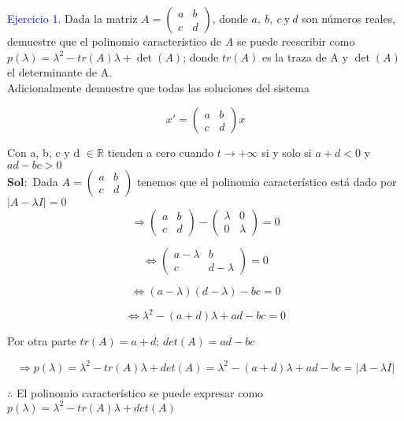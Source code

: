 \textcolor{blue}{Ejercicio 1.} Dada la matriz $ A= \begin{pmatrix}
a & b\\
c & d
\end{pmatrix}$, donde $a,\: b,\: c\: \mbox{y} \: d$ son números reales, demuestre que el polinomio característico de $A$ se puede reescribir como $p(\lambda)= \lambda^2 -tr(A) \lambda + \det(A)$; donde $tr(A)$ es la traza de A  y $\det(A)$ el determinante de A.\\
Adicionalmente demuestre que todas las soluciones del sistema

$$ x'= \begin{pmatrix}
a & b\\
c & d
\end{pmatrix}x$$

Con a, b, c y d $\in \mathbb{R}$ tienden a cero cuando $t \rightarrow + \infty$ si y solo si $a + d < 0$ y $ad -bc > 0$\\

$\mathbf{Sol:}$ Dada $A= \begin{pmatrix} a & b\\ c & d
\end{pmatrix}$ tenemos que el polinomio característico está dado por $|A - \lambda I|=0$\\


$$\Rightarrow \begin{pmatrix} a & b\\ c & d \end{pmatrix} - \begin{pmatrix}  \lambda & 0 \\ 0 & \lambda \end{pmatrix} = 0$$

$$\Leftrightarrow \begin{pmatrix} a - \lambda  & b\\ c & d - \lambda
\end{pmatrix} = 0$$

$$\Leftrightarrow (a - \lambda)(d - \lambda) - bc = 0$$

$$ \Leftrightarrow \lambda^2 - (a + d)\lambda + ad - bc = 0$$

Por otra parte $tr(A)= a + d$; $det(A)= ad -bc$

$$\Rightarrow p(\lambda)= \lambda^2 - tr(A)\lambda + det(A)= \lambda^2 - (a+d)\lambda + ad -bc = |A - \lambda I|$$

$\therefore$ El polinomio característico se puede expresar como $p(\lambda)= \lambda^2 -tr(A)\lambda + det(A)$

